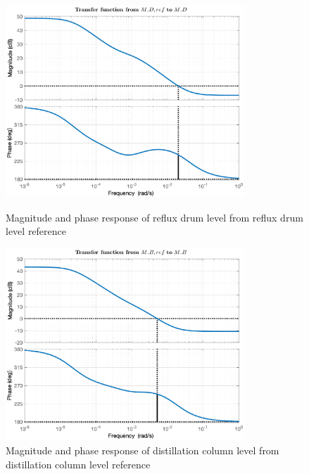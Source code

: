 \documentclass[12pt]{article}
\begin{document}
\begin{figure}[p]
\centering
\includegraphics[width=0.8\textwidth]{../Systemanalyse/Log_Data_to_Matlab/Figurer/Identifisering/MD_bode.eps}
\caption{Magnitude and phase response of reflux drum level from reflux drum level reference}
\label{fig:L11}

\includegraphics[width=0.8\textwidth]{../Systemanalyse/Log_Data_to_Matlab/Figurer/Identifisering/MB_bode.eps}
\caption{Magnitude and phase response of distillation column level from distillation column level reference}
\label{fig:L22}
\end{figure}
\end{document}
